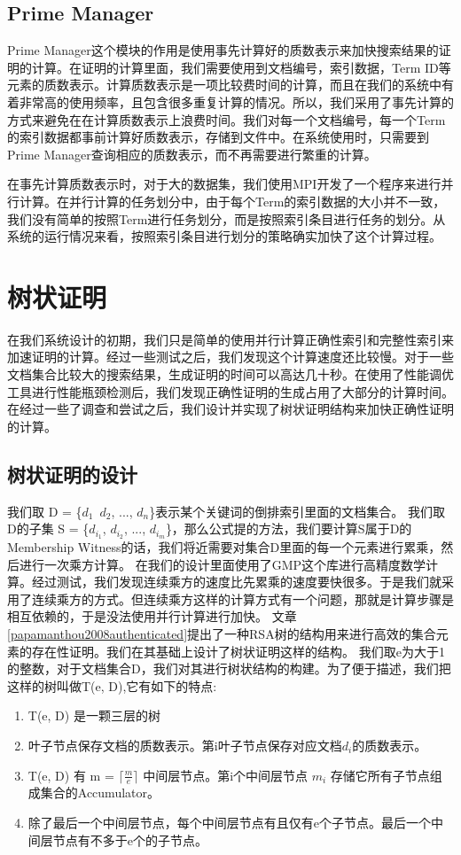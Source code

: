 \subsection{Prime Manager}
Prime Manager这个模块的作用是使用事先计算好的质数表示来加快搜索结果的证明的计算。在证明的计算里面，我们需要使用到文档编号，索引数据，Term ID等元素的质数表示。计算质数表示是一项比较费时间的计算，而且在我们的系统中有着非常高的使用频率，且包含很多重复计算的情况。所以，我们采用了事先计算的方式来避免在在计算质数表示上浪费时间。我们对每一个文档编号，每一个Term的索引数据都事前计算好质数表示，存储到文件中。在系统使用时，只需要到Prime Manager查询相应的质数表示，而不再需要进行繁重的计算。

在事先计算质数表示时，对于大的数据集，我们使用MPI开发了一个程序来进行并行计算。在并行计算的任务划分中，由于每个Term的索引数据的大小并不一致，我们没有简单的按照Term进行任务划分，而是按照索引条目进行任务的划分。从系统的运行情况来看，按照索引条目进行划分的策略确实加快了这个计算过程。

\section{树状证明}
在我们系统设计的初期，我们只是简单的使用并行计算正确性索引和完整性索引来加速证明的计算。经过一些测试之后，我们发现这个计算速度还比较慢。对于一些文档集合比较大的搜索结果，生成证明的时间可以高达几十秒。在使用了性能调优工具进行性能瓶颈检测后，我们发现正确性证明的生成占用了大部分的计算时间。在经过一些了调查和尝试之后，我们设计并实现了树状证明结构来加快正确性证明的计算。

\subsection{树状证明的设计}

我们取 D = \{$d_1$\, $d_2$, ..., $d_n$\}表示某个关键词的倒排索引里面的文档集合。
我们取D的子集 S = \{$d_{i_1}$, $d_{i_2}$, ..., $d_{i_m}$\}，那么公式提的方法，我们要计算S属于D的Membership Witness的话，我们将近需要对集合D里面的每一个元素进行累乘，然后进行一次乘方计算。
在我们的设计里面使用了GMP这个库进行高精度数学计算。经过测试，我们发现连续乘方的速度比先累乘的速度要快很多。于是我们就采用了连续乘方的方式。但连续乘方这样的计算方式有一个问题，那就是计算步骤是相互依赖的，于是没法使用并行计算进行加快。
文章\ref{papamanthou2008authenticated}提出了一种RSA树的结构用来进行高效的集合元素的存在性证明。我们在其基础上设计了树状证明这样的结构。
我们取e为大于1的整数，对于文档集合D，我们对其进行树状结构的构建。为了便于描述，我们把这样的树叫做T(e, D),它有如下的特点:
\begin{enumerate}
  \item T(e, D) 是一颗三层的树
  \item 叶子节点保存文档的质数表示。第i叶子节点保存对应文档$d_i$的质数表示。
  \item T(e, D) 有 m = $\lceil \frac{m}{e} \rceil$ 中间层节点。第i个中间层节点 $m_i$ 存储它所有子节点组成集合的Accumulator。
  \item 除了最后一个中间层节点，每个中间层节点有且仅有e个子节点。最后一个中间层节点有不多于e个的子节点。
\end{enumerate}

